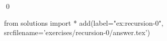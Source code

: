 
\begin{ex} 
  \label{ex:recursion-0}
  
  \qed
\end{ex} 
\begin{python0}
from solutions import *
add(label="ex:recursion-0",
    srcfilename='exercises/recursion-0/answer.tex') 
\end{python0}
